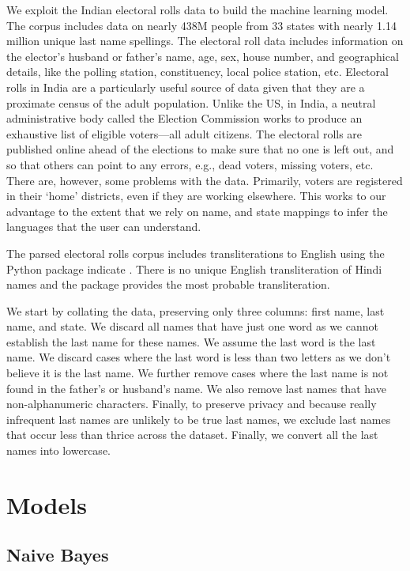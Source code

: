 \documentclass[11pt,  letterpaper]{article}
\begin{document}
We exploit the Indian electoral rolls data \citep{DVN/OG47IV_2023, DVN/MUEGDT_2018} to build the machine learning model. The corpus includes data on nearly 438M people from 33 states with nearly 1.14 million unique last name spellings. The electoral roll data includes information on the elector's husband or father’s name, age, sex, house number, and geographical details, like the polling station, constituency, local police station, etc. Electoral rolls in India are a particularly useful source of data given that they are a proximate census of the adult population. Unlike the US, in India, a neutral administrative body called the Election Commission works to produce an exhaustive list of eligible voters—all adult citizens. The electoral rolls are published online ahead of the elections to make sure that no one is left out, and so that others can point to any errors, e.g., dead voters, missing voters, etc. There are, however, some problems with the data. Primarily, voters are registered in their `home' districts, even if they are working elsewhere. This works to our advantage to the extent that we rely on name, and state mappings to infer the languages that the user can understand.

The parsed electoral rolls corpus \citep{DVN/MUEGDT_2018} includes transliterations to English using the Python package indicate \citep{Chintalapati_Indicate_Transliterate_Indic_2022}. There is no unique English transliteration of Hindi names and the package provides the most probable transliteration. 

We start by collating the data, preserving only three columns: first name, last name, and state. We discard all names that have just one word as we cannot establish the last name for these names. We assume the last word is the last name. We discard cases where the last word is less than two letters as we don't believe it is the last name. We further remove cases where the last name is not found in the father's or husband's name. We also remove last names that have non-alphanumeric characters. Finally, to preserve privacy and because really infrequent last names are unlikely to be true last names, we exclude last names that occur less than thrice across the dataset. Finally, we convert all the last names into lowercase. 

\section{Models}

\subsection{Naive Bayes}
\end{document}
